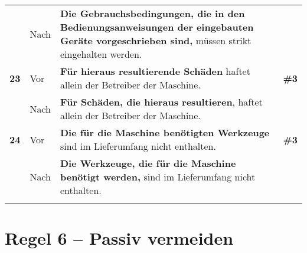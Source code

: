 \begin{longtable}{llp{}l}
& Nach & \textbf{Die Gebrauchsbedingungen, die in den Bedienungsanweisungen der eingebauten Geräte vorgeschrieben sind,} müssen strikt eingehalten werden. & \\
\tablevspace
{ \textbf{23}} & Vor & \textbf{Für hieraus resultierende Schäden} haftet allein der Betreiber der Maschine. & \textbf{\#3}\\
& Nach & \textbf{Für Schäden, die hieraus resultieren}, haftet allein der Betreiber der Maschine. & \\
\tablevspace
{ \textbf{24}} & Vor & \textbf{Die für die Maschine benötigten Werkzeuge} sind im Lieferumfang nicht enthalten. & \textbf{\#3}\\
& Nach & \textbf{Die Werkzeuge, die für die Maschine benötigt werden,} sind im Lieferumfang nicht enthalten. & \\
\lspbottomrule
\end{longtable}


\section*{Regel 6 -- Passiv vermeiden}


